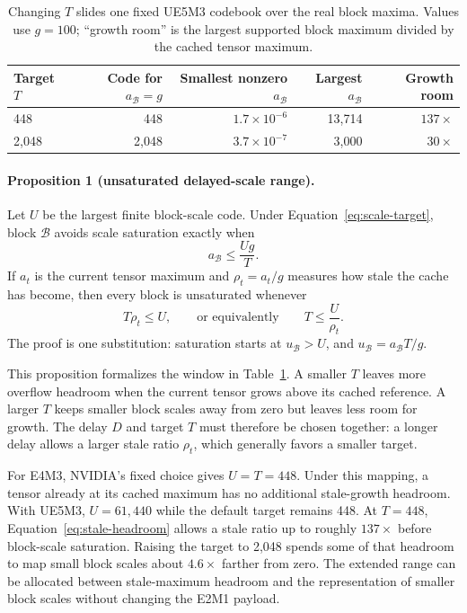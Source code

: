 \documentclass[11pt]{article}
\newcommand{\ue}{UE5M3}
\begin{document}
\begin{table}[H]
  \centering
  \small
  \caption{Changing $T$ slides one fixed \ue{} codebook over the real block
  maxima.  Values use $g=100$; ``growth room'' is the largest supported block
  maximum divided by the cached tensor maximum.}
  \label{tab:scale-target-example}
  \begin{tabular}{@{}lrrrr@{}}
    \toprule
    Target $T$ & Code for $a_{\mathcal B}=g$ & Smallest nonzero $a_{\mathcal B}$ & Largest $a_{\mathcal B}$ & Growth room \\
    \midrule
    448   & 448   & $1.7\times10^{-6}$ & 13,714 & $137\times$ \\
    2,048 & 2,048 & $3.7\times10^{-7}$ & 3,000  & $30\times$ \\
    \bottomrule
  \end{tabular}
\end{table}

\paragraph{Proposition 1 (unsaturated delayed-scale range).}
Let $U$ be the largest finite block-scale code.  Under
Equation~\ref{eq:scale-target}, block $\mathcal B$ avoids scale saturation exactly when
\begin{equation}
  a_{\mathcal B} \le \frac{Ug}{T}.
  \label{eq:effective-range}
\end{equation}
If $a_t$ is the current tensor maximum and
$\rho_t=a_t/g$ measures how stale the cache has become, then every block is
unsaturated whenever
\begin{equation}
  T\rho_t\le U,
  \qquad\text{or equivalently}\qquad
  T\le\frac{U}{\rho_t}.
  \label{eq:stale-headroom}
\end{equation}
The proof is one substitution: saturation starts at $u_{\mathcal B}>U$, and
$u_{\mathcal B}=a_{\mathcal B}T/g$.

This proposition formalizes the window in
Table~\ref{tab:scale-target-example}.  A smaller $T$ leaves more overflow
headroom when the current tensor grows above its cached reference.  A larger
$T$ keeps smaller block scales away from zero but leaves less room for growth.
The delay $D$ and target $T$ must therefore be chosen together: a longer delay
allows a larger stale ratio $\rho_t$, which generally favors a smaller target.

For E4M3, NVIDIA's fixed choice gives $U=T=448$.  Under this mapping, a tensor
already at its cached maximum has no additional stale-growth headroom.  With
\ue{}, $U=61{,}440$ while the default target remains 448.  At $T=448$,
Equation~\ref{eq:stale-headroom} allows a stale ratio up to roughly
$137\times$ before block-scale saturation.  Raising the target to 2,048 spends
some of that headroom to map small block scales about $4.6\times$ farther from
zero.
The extended range can be allocated between stale-maximum headroom and the
representation of smaller block scales without changing the E2M1 payload.
\end{document}
